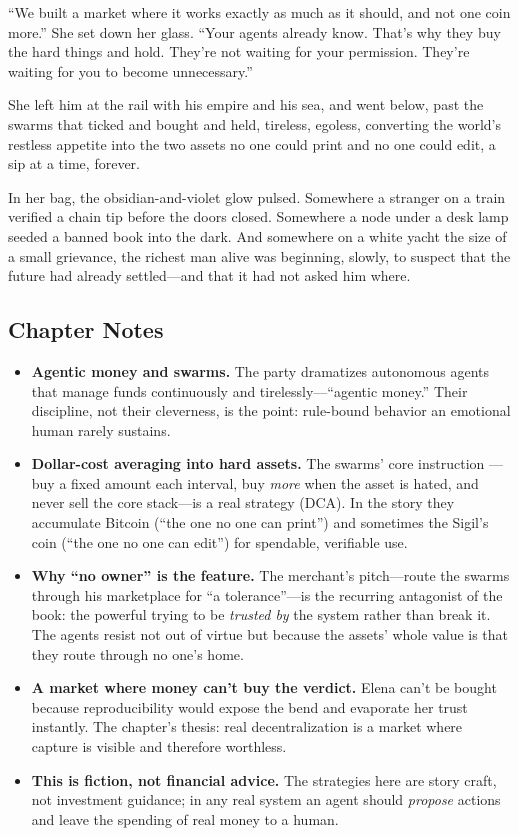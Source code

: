 \documentclass[12pt,letterpaper]{book}
\providecommand{\tightlist}{\setlength{\itemsep}{0pt}\setlength{\parskip}{0pt}}
\begin{document}
``We built a market where it works exactly as much as it should, and not one coin
more.'' She set down her glass. ``Your agents already know. That's why they buy the
hard things and hold. They're not waiting for your permission. They're waiting for
you to become unnecessary.''

She left him at the rail with his empire and his sea, and went below, past the
swarms that ticked and bought and held, tireless, egoless, converting the world's
restless appetite into the two assets no one could print and no one could edit, a
sip at a time, forever.

In her bag, the obsidian-and-violet glow pulsed. Somewhere a stranger on a train
verified a chain tip before the doors closed. Somewhere a node under a desk lamp
seeded a banned book into the dark. And somewhere on a white yacht the size of a
small grievance, the richest man alive was beginning, slowly, to suspect that the
future had already settled---and that it had not asked him where.

\hypertarget{chapter-12-notes}{%
\subsection{Chapter Notes}\label{chapter-12-notes}}

\begin{itemize}
\tightlist
\item
  \textbf{Agentic money and swarms.} The party dramatizes autonomous agents that
  manage funds continuously and tirelessly---``agentic money.'' Their discipline,
  not their cleverness, is the point: rule-bound behavior an emotional human
  rarely sustains.
\item
  \textbf{Dollar-cost averaging into hard assets.} The swarms' core instruction
  ---buy a fixed amount each interval, buy \emph{more} when the asset is hated,
  and never sell the core stack---is a real strategy (DCA). In the story they
  accumulate Bitcoin (``the one no one can print'') and sometimes the Sigil's coin
  (``the one no one can edit'') for spendable, verifiable use.
\item
  \textbf{Why ``no owner'' is the feature.} The merchant's pitch---route the
  swarms through his marketplace for ``a tolerance''---is the recurring antagonist
  of the book: the powerful trying to be \emph{trusted by} the system rather than
  break it. The agents resist not out of virtue but because the assets' whole
  value is that they route through no one's home.
\item
  \textbf{A market where money can't buy the verdict.} Elena can't be bought
  because reproducibility would expose the bend and evaporate her trust instantly.
  The chapter's thesis: real decentralization is a market where capture is
  visible and therefore worthless.
\item
  \textbf{This is fiction, not financial advice.} The strategies here are story
  craft, not investment guidance; in any real system an agent should
  \emph{propose} actions and leave the spending of real money to a human.
\end{itemize}
\end{document}
